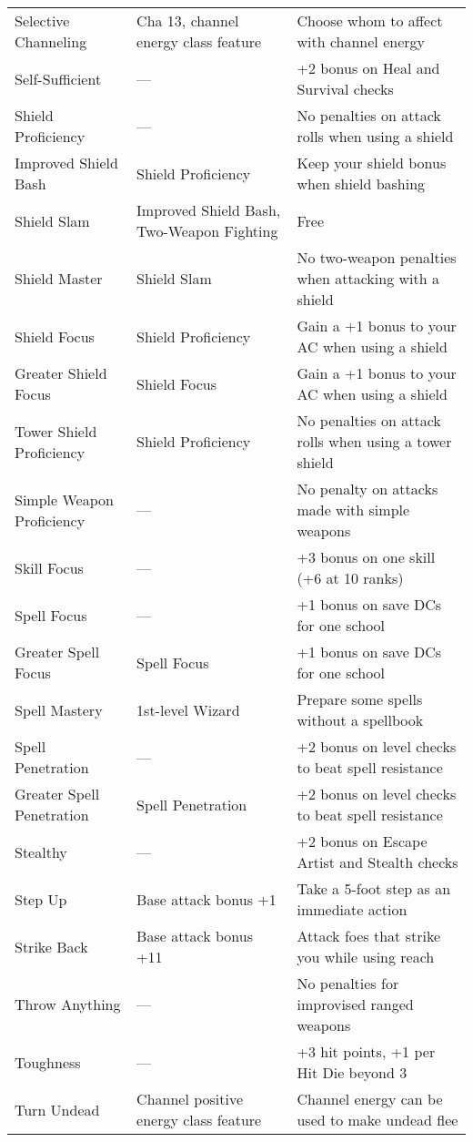 \begin{table*}
\begin{tabularx}{\linewidth}{lXl}
Selective Channeling & Cha 13, channel energy class feature & Choose whom to affect with channel energy\\
Self-Sufficient & --- & +2 bonus on Heal and Survival checks\\
Shield Proficiency & --- & No penalties on attack rolls when using a shield\\
\quad Improved Shield Bash & Shield Proficiency & Keep your shield bonus when shield bashing\\
\quad \quad Shield Slam & Improved Shield Bash, Two-Weapon Fighting & Free \\
\quad \quad \quad Shield Master & Shield Slam & No two-weapon penalties when attacking with a shield\\
\quad Shield Focus & Shield Proficiency & Gain a +1 bonus to your AC when using a shield\\
\quad \quad Greater Shield Focus & Shield Focus & Gain a +1 bonus to your AC when using a shield\\
\quad Tower Shield Proficiency & Shield Proficiency & No penalties on attack rolls when using a tower shield\\
Simple Weapon Proficiency & --- & No penalty on attacks made with simple weapons\\
Skill Focus & --- & +3 bonus on one skill (+6 at 10 ranks)\\
Spell Focus & --- & +1 bonus on save DCs for one school\\
\quad Greater Spell Focus & Spell Focus & +1 bonus on save DCs for one school\\
Spell Mastery & 1st-level Wizard & Prepare some spells without a spellbook\\
Spell Penetration & --- & +2 bonus on level checks to beat spell resistance\\
\quad Greater Spell Penetration & Spell Penetration & +2 bonus on level checks to beat spell resistance\\
Stealthy & --- & +2 bonus on Escape Artist and Stealth checks\\
Step Up & Base attack bonus +1 & Take a 5-foot step as an immediate action\\
Strike Back & Base attack bonus +11 & Attack foes that strike you while using reach\\
Throw Anything & --- & No penalties for improvised ranged weapons\\
Toughness & --- & +3 hit points, +1 per Hit Die beyond 3\\
Turn Undead & Channel positive energy class feature & Channel energy can be used to make undead flee\\

\end{tabularx}
\end{table*}
